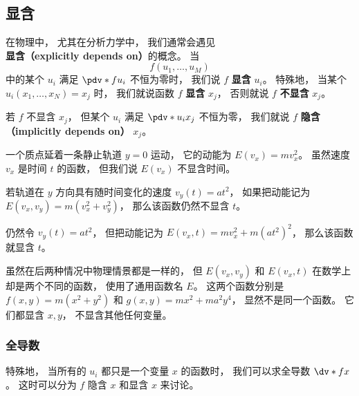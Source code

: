 \subsection{显含}\label{PChain_sub1}
在物理中， 尤其在分析力学中， 我们通常会遇见\textbf{显含（explicitly depends on）}的概念。 当
\begin{equation}
f(u_1, \dots, u_M)
\end{equation}
中的某个 $u_i$ 满足 $\pdv*{f}{u_i}$ 不恒为零时， 我们说 $f$ \textbf{显含} $u_i$。 特殊地， 当某个 $u_i(x_1, \dots, x_N) = x_j$ 时， 我们就说函数 $f$ \textbf{显含} $x_j$， 否则就说 $f$ \textbf{不显含} $x_j$。

若 $f$ 不显含 $x_j$， 但某个 $u_i$ 满足 $\pdv*{u_i}{x_j}$ 不恒为零， 我们就说 $f$ \textbf{隐含（implicitly depends on）} $x_j$。

\begin{example}{}
一个质点延着一条静止轨道 $y = 0$ 运动， 它的动能为 $E(v_x) = m v_x^2$。 虽然速度 $v_x$ 是时间 $t$ 的函数， 但我们说 $E(v_x)$ 不显含时间。

若轨道在 $y$ 方向具有随时间变化的速度 $v_y(t) = a t^2$， 如果把动能记为 $E(v_x, v_y) = m(v_x^2 + v_y^2)$， 那么该函数仍然不显含 $t$。

仍然令 $v_y(t) = a t^2$， 但把动能记为 $E(v_x, t) = m v_x^2 + m (a t^2)^2$， 那么该函数就显含 $t$。

虽然在后两种情况中物理情景都是一样的， 但 $E(v_x, v_y)$ 和 $E(v_x, t)$ 在数学上却是两个不同的函数， 使用了通用函数名 $E$。 这两个函数分别是 $f(x, y) = m(x^2 + y^2)$ 和 $g(x, y) = mx^2 + ma^2 y^4$， 显然不是同一个函数。 它们都显含 $x, y$， 不显含其他任何变量。
\end{example}

\subsubsection{全导数}
特殊地， 当所有的 $u_i$ 都只是一个变量 $x$ 的函数时， 我们可以求全导数 $\dv*{f}{x}$。 这时可以分为 $f$ 隐含 $x$ 和显含 $x$ 来讨论。

